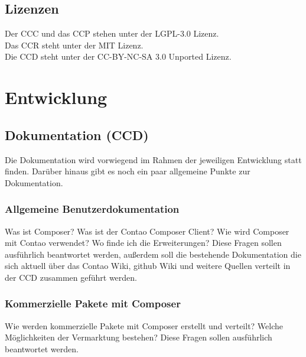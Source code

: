 \documentclass[
paper=a4,
draft=false,%
fontsize=10pt%
]{scrartcl}
\begin{document}
\subsection{Lizenzen}

Der CCC und das CCP stehen unter der LGPL-3.0 Lizenz.\\
Das CCR steht unter der MIT Lizenz. \\
Die CCD steht unter der CC-BY-NC-SA 3.0 Unported Lizenz.

\newpage

%
%

\section{Entwicklung}
\label{sec:development}

\subsection{Dokumentation (CCD)}
\label{subsec:ccd}

Die Dokumentation wird vorwiegend im Rahmen der jeweiligen Entwicklung statt finden. Darüber hinaus gibt es noch ein paar allgemeine Punkte zur Dokumentation.

\subsubsection{Allgemeine Benutzerdokumentation}

Was ist Composer? Was ist der Contao Composer Client? Wie wird Composer mit Contao verwendet? Wo finde ich die Erweiterungen?
Diese Fragen sollen ausführlich beantwortet werden, außerdem soll die bestehende Dokumentation die sich aktuell über das Contao Wiki, github Wiki und weitere Quellen verteilt in der CCD zusammen geführt werden.

\subsubsection{Kommerzielle Pakete mit Composer}

Wie werden kommerzielle Pakete mit Composer erstellt und verteilt? Welche Möglichkeiten der Vermarktung bestehen? Diese Fragen sollen ausführlich beantwortet werden.

\pagebreak
\end{document}
